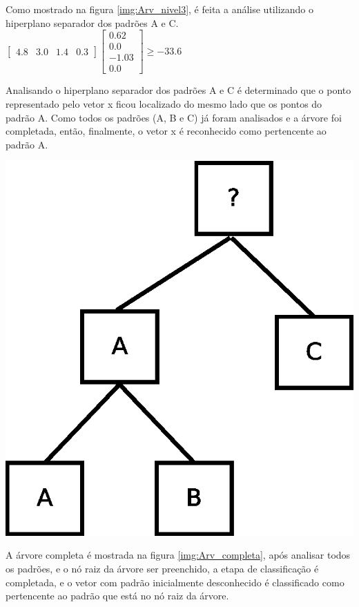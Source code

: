 Como mostrado na figura \ref{img:Arv_nivel3}, é feita a análise utilizando o hiperplano separador dos padrões A e C.
$ \begin{bmatrix}
4.8 & 3.0 & 1.4 & 0.3 
\end{bmatrix}
\begin{bmatrix}
0.62
\\ 
0.0
\\
-1.03
\\
0.0 
\end{bmatrix}
\geq  -33.6 $ 

Analisando o hiperplano separador dos padrões A e C é determinado que o ponto representado pelo vetor x ficou localizado do mesmo lado que os pontos do padrão A. Como todos os padrões (A, B e C) já foram analisados e a árvore foi completada, então, finalmente, o vetor x é reconhecido como pertencente ao padrão A.

\begin{center}
	\includegraphics[scale=0.4]{graficos/arvore_nivel3}
	\label{img:Arv_completa}
\end{center}

A árvore completa é mostrada na figura \ref{img:Arv_completa}, após analisar todos os padrões, e o nó raiz da árvore ser preenchido, a etapa de classificação é completada, e o vetor com padrão inicialmente desconhecido é classificado como pertencente ao padrão que está no nó raiz da árvore.

